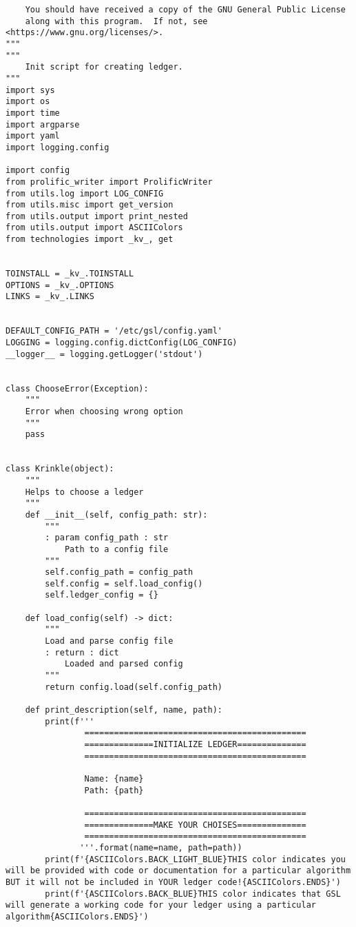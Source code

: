 \begin{lstlisting}
    You should have received a copy of the GNU General Public License
    along with this program.  If not, see <https://www.gnu.org/licenses/>.
"""
"""
    Init script for creating ledger.
"""
import sys
import os
import time
import argparse
import yaml
import logging.config

import config
from prolific_writer import ProlificWriter
from utils.log import LOG_CONFIG
from utils.misc import get_version
from utils.output import print_nested
from utils.output import ASCIIColors
from technologies import _kv_, get


TOINSTALL = _kv_.TOINSTALL
OPTIONS = _kv_.OPTIONS
LINKS = _kv_.LINKS


DEFAULT_CONFIG_PATH = '/etc/gsl/config.yaml'
LOGGING = logging.config.dictConfig(LOG_CONFIG)
__logger__ = logging.getLogger('stdout')


class ChooseError(Exception):
    """
    Error when choosing wrong option
    """
    pass


class Krinkle(object):
    """
    Helps to choose a ledger
    """
    def __init__(self, config_path: str):
        """
        : param config_path : str
            Path to a config file
        """
        self.config_path = config_path
        self.config = self.load_config()
        self.ledger_config = {}

    def load_config(self) -> dict:
        """
        Load and parse config file
        : return : dict
            Loaded and parsed config
        """
        return config.load(self.config_path)

    def print_description(self, name, path):
        print(f'''
                =============================================
                ==============INITIALIZE LEDGER==============
                =============================================

                Name: {name}
                Path: {path}

                =============================================
                ==============MAKE YOUR CHOISES==============
                =============================================
               '''.format(name=name, path=path))
        print(f'{ASCIIColors.BACK_LIGHT_BLUE}THIS color indicates you will be provided with code or documentation for a particular algorithm BUT it will not be included in YOUR ledger code!{ASCIIColors.ENDS}')
        print(f'{ASCIIColors.BACK_BLUE}THIS color indicates that GSL will generate a working code for your ledger using a particular algorithm{ASCIIColors.ENDS}')


\end{lstlisting}

